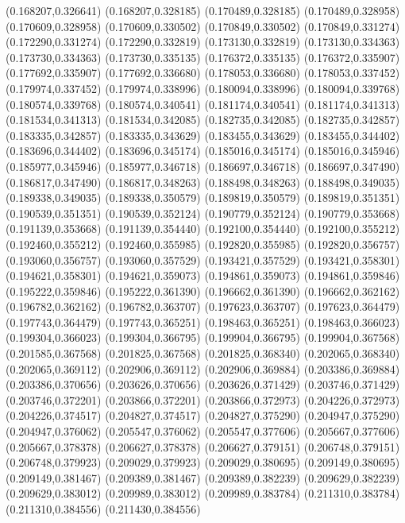 (0.168207,0.326641)
(0.168207,0.328185)
(0.170489,0.328185)
(0.170489,0.328958)
(0.170609,0.328958)
(0.170609,0.330502)
(0.170849,0.330502)
(0.170849,0.331274)
(0.172290,0.331274)
(0.172290,0.332819)
(0.173130,0.332819)
(0.173130,0.334363)
(0.173730,0.334363)
(0.173730,0.335135)
(0.176372,0.335135)
(0.176372,0.335907)
(0.177692,0.335907)
(0.177692,0.336680)
(0.178053,0.336680)
(0.178053,0.337452)
(0.179974,0.337452)
(0.179974,0.338996)
(0.180094,0.338996)
(0.180094,0.339768)
(0.180574,0.339768)
(0.180574,0.340541)
(0.181174,0.340541)
(0.181174,0.341313)
(0.181534,0.341313)
(0.181534,0.342085)
(0.182735,0.342085)
(0.182735,0.342857)
(0.183335,0.342857)
(0.183335,0.343629)
(0.183455,0.343629)
(0.183455,0.344402)
(0.183696,0.344402)
(0.183696,0.345174)
(0.185016,0.345174)
(0.185016,0.345946)
(0.185977,0.345946)
(0.185977,0.346718)
(0.186697,0.346718)
(0.186697,0.347490)
(0.186817,0.347490)
(0.186817,0.348263)
(0.188498,0.348263)
(0.188498,0.349035)
(0.189338,0.349035)
(0.189338,0.350579)
(0.189819,0.350579)
(0.189819,0.351351)
(0.190539,0.351351)
(0.190539,0.352124)
(0.190779,0.352124)
(0.190779,0.353668)
(0.191139,0.353668)
(0.191139,0.354440)
(0.192100,0.354440)
(0.192100,0.355212)
(0.192460,0.355212)
(0.192460,0.355985)
(0.192820,0.355985)
(0.192820,0.356757)
(0.193060,0.356757)
(0.193060,0.357529)
(0.193421,0.357529)
(0.193421,0.358301)
(0.194621,0.358301)
(0.194621,0.359073)
(0.194861,0.359073)
(0.194861,0.359846)
(0.195222,0.359846)
(0.195222,0.361390)
(0.196662,0.361390)
(0.196662,0.362162)
(0.196782,0.362162)
(0.196782,0.363707)
(0.197623,0.363707)
(0.197623,0.364479)
(0.197743,0.364479)
(0.197743,0.365251)
(0.198463,0.365251)
(0.198463,0.366023)
(0.199304,0.366023)
(0.199304,0.366795)
(0.199904,0.366795)
(0.199904,0.367568)
(0.201585,0.367568)
(0.201825,0.367568)
(0.201825,0.368340)
(0.202065,0.368340)
(0.202065,0.369112)
(0.202906,0.369112)
(0.202906,0.369884)
(0.203386,0.369884)
(0.203386,0.370656)
(0.203626,0.370656)
(0.203626,0.371429)
(0.203746,0.371429)
(0.203746,0.372201)
(0.203866,0.372201)
(0.203866,0.372973)
(0.204226,0.372973)
(0.204226,0.374517)
(0.204827,0.374517)
(0.204827,0.375290)
(0.204947,0.375290)
(0.204947,0.376062)
(0.205547,0.376062)
(0.205547,0.377606)
(0.205667,0.377606)
(0.205667,0.378378)
(0.206627,0.378378)
(0.206627,0.379151)
(0.206748,0.379151)
(0.206748,0.379923)
(0.209029,0.379923)
(0.209029,0.380695)
(0.209149,0.380695)
(0.209149,0.381467)
(0.209389,0.381467)
(0.209389,0.382239)
(0.209629,0.382239)
(0.209629,0.383012)
(0.209989,0.383012)
(0.209989,0.383784)
(0.211310,0.383784)
(0.211310,0.384556)
(0.211430,0.384556)
